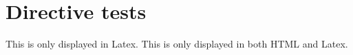 \documentclass[11pt]{report}
\begin{document}
\label{}
        \section{Directive tests}
    
    This is only displayed in Latex.
    This is only displayed in both HTML and Latex.
\end{document}

